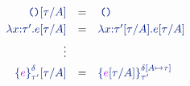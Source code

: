 \[
\begin{array}{r l l}
  \sunit \ssubst{\svar{A}}{\stau} & = & \sunit
  \\[0.3em]
  \sabs{\svar{x}}{\staup}{\sexp} \ssubst{\svar{A}}{\stau} & = &
  \sabs{\svar{x}}{\staup\ssubst{\svar{A}}{\stau}}{\sexp\ssubst{\svar{A}}{\stau}}
  \\[0.3em]
  \vdots 
  \\[0.3em]
  \salien{\texp}{\staup}{\sdelta}\ssubst{\svar{A}}{\stau}  & = &
  \salien{\texp\ssubst{\svar{A}}{\stau}}{\staup}
 {\sesubstext{\sdelta}{\svar{A}}{\stau}}
  \\[0.3em]
\end{array}
\]
